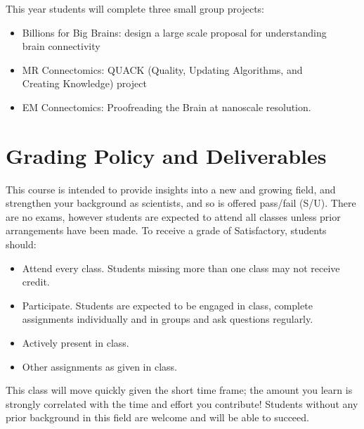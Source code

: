 \documentclass[12pt]{article}
\begin{document}
This year students will complete three small group projects: 

\begin{itemize}[noitemsep]
\item Billions for Big Brains:  design a large scale proposal for understanding \\ brain connectivity
\item MR Connectomics:  QUACK (Quality, Updating Algorithms, and \\ Creating Knowledge) project
\item EM Connectomics:  Proofreading the Brain at nanoscale resolution.
\end{itemize}
\section*{Grading Policy and Deliverables}

This course is intended to provide insights into a new and growing field, and strengthen your background as scientists, and so is offered pass/fail (S/U).  There are no exams, however students are expected to attend all classes unless prior arrangements have been made.  To receive a grade of Satisfactory, students should:

\begin{itemize}[noitemsep]
\item{Attend every class.  Students missing more than one class may not receive credit.}
\item{Participate.  Students are expected to be engaged in class, complete assignments individually and in groups and ask questions regularly.}
\item{Actively present in class.}
\item{Other assignments as given in class.}
\end{itemize}

This class will move quickly given the short time frame; the amount you learn is strongly correlated with the time and effort you contribute!  Students without any prior background in this field are welcome and will be able to succeed.
\vspace{-0.5cm}
\end{document}
